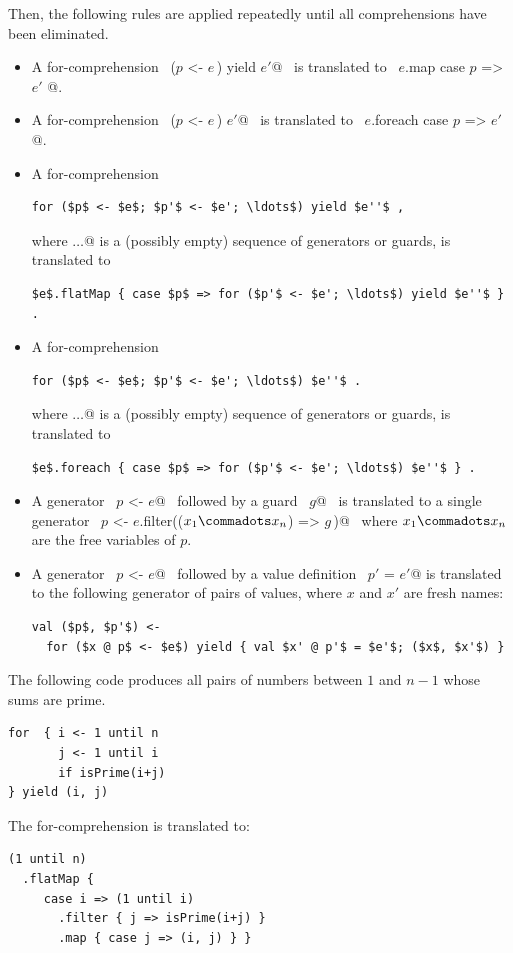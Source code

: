 Then, the following rules are applied repeatedly until all
comprehensions have been eliminated.
\begin{itemize}
\item
A for-comprehension 
~\lstinline@for ($p$ <- $e\,$) yield $e'$@~ 
is translated to
~\lstinline@$e$.map { case $p$ => $e'$ }@.

\item
A for-comprehension
~\lstinline@for ($p$ <- $e\,$) $e'$@~ 
is translated to
~\lstinline@$e$.foreach { case $p$ => $e'$ }@.

\item
A for-comprehension
\begin{lstlisting}
for ($p$ <- $e$; $p'$ <- $e'; \ldots$) yield $e''$ ,
\end{lstlisting}
where \lstinline@$\ldots$@ is a (possibly empty)
sequence of generators or guards,
is translated to
\begin{lstlisting}
$e$.flatMap { case $p$ => for ($p'$ <- $e'; \ldots$) yield $e''$ } .
\end{lstlisting}
\item
A for-comprehension
\begin{lstlisting}
for ($p$ <- $e$; $p'$ <- $e'; \ldots$) $e''$ .
\end{lstlisting}
where \lstinline@$\ldots$@ is a (possibly empty)
sequence of generators or guards,
is translated to
\begin{lstlisting}
$e$.foreach { case $p$ => for ($p'$ <- $e'; \ldots$) $e''$ } .
\end{lstlisting}
\item
A generator ~\lstinline@$p$ <- $e$@~ followed by a guard
~\lstinline@if $g$@~ is translated to a single generator 
~\lstinline@$p$ <- $e$.filter(($x_1 \commadots x_n$) => $g\,$)@~ where
$x_1 \commadots x_n$ are the free variables of $p$.
\item
A generator ~\lstinline@$p$ <- $e$@~ followed by a value definition 
~\lstinline@val $p'$ = $e'$@ is translated to the following generator of pairs of values, where
$x$ and $x'$ are fresh names:
\begin{lstlisting}
val ($p$, $p'$) <- 
  for ($x @ p$ <- $e$) yield { val $x' @ p'$ = $e'$; ($x$, $x'$) }
\end{lstlisting}
\end{itemize}

\example
The following code produces all pairs of numbers
between $1$ and $n-1$ whose sums are prime.
\begin{lstlisting}
for  { i <- 1 until n 
       j <- 1 until i 
       if isPrime(i+j)
} yield (i, j)
\end{lstlisting}
The for-comprehension is translated to:
\begin{lstlisting}
(1 until n)
  .flatMap {
     case i => (1 until i)
       .filter { j => isPrime(i+j) }
       .map { case j => (i, j) } }
\end{lstlisting}

